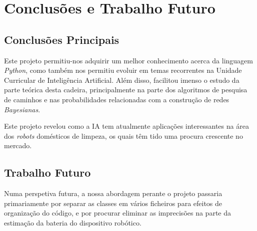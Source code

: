 \chapter{Conclusões e Trabalho Futuro}
\label{chap:conc-trab-futuro}

\section{Conclusões Principais}
\label{sec:conc-princ}

Este projeto permitiu-nos adquirir um melhor conhecimento acerca da linguagem \emph{Python}, como também nos permitiu evoluir em temas recorrentes na Unidade Curricular de Inteligência Artificial. Além disso, facilitou imenso o estudo da parte teórica desta cadeira, principalmente na parte dos algoritmos de pesquisa de caminhos e nas probabilidades relacionadas com a construção de redes \emph{Bayesianas}.

Este projeto revelou como a \ac{IA} tem atualmente aplicações interessantes na área dos \emph{robots} domésticos de limpeza, os quais têm tido uma procura crescente no mercado.


\section{Trabalho Futuro}
\label{sec:trab-futuro}

Numa perspetiva futura, a nossa abordagem perante o projeto passaria primariamente por separar as classes em vários ficheiros para efeitos de organização do código, e por procurar eliminar as imprecisões na parte da estimação da bateria do dispositivo robótico.
